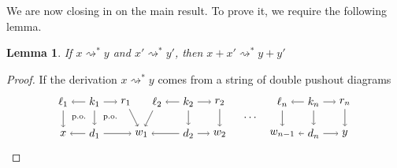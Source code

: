\documentclass{amsart}
\newcommand{\deriv}[2]{#1 \rightsquigarrow^\ast #2}
\newtheorem{lemma}[theorem]{Lemma}
\theoremstyle{remark}
\theoremstyle{definition}
\begin{document}
We are now closing in on the main result.  To prove it, we require the
following lemma.

\begin{lemma}
\label{thm:rewrite-rel-is-additive}
  If $ \deriv{x}{y} $ and $ \deriv{x'}{y'} $, then $ \deriv{x+x'}{y+y'} $
\end{lemma}

\begin{proof}
  If the derivation $ \deriv{x}{y} $ comes from a string of double
  pushout diagrams
  \[
    \begin{tikzpicture}
      \node (1t) at (0,1) {$ \ell_1 $};
      \node (2t) at (1,1) {$ k_1 $};
      \node (3t) at (2,1) {$ r_1 $};
      \node (4t) at (3,1) {$ \ell_2 $};
      \node (5t) at (4,1) {$ k_2 $};
      \node (6t) at (5,1) {$ r_2 $};
      \node (7t) at (7,1) {$ \ell_n $};
      \node (8t) at (8,1) {$ k_n $};
      \node (9t) at (9,1) {$ r_n $};
      \node (1b) at (0,0) {$ x $};
      \node (2b) at (1,0) {$ d_1 $};
      \node (3b) at (2.5,0) {$ w_1 $};
      \node (4b) at (4,0) {$ d_2 $};
      \node (5b) at (5,0) {$ w_2 $};
      \node (6b) at (7,0) {$ w_{n-1} $};
      \node (7b) at (8,0) {$ d_n $};
      \node (8b) at (9,0) {$ y $};
      \draw [->] (2t) to node [] {\scriptsize{$  $}} (1t);
      \draw [->] (2t) to node [] {\scriptsize{$  $}} (3t);
      \draw [->] (5t) to node [] {\scriptsize{$  $}} (4t);
      \draw [->] (5t) to node [] {\scriptsize{$  $}} (6t);
      \draw [->] (8t) to node [] {\scriptsize{$  $}} (7t);
      \draw [->] (8t) to node [] {\scriptsize{$  $}} (9t);
      \draw [->] (2b) to node [] {\scriptsize{$  $}} (1b);
      \draw [->] (2b) to node [] {\scriptsize{$  $}} (3b);
      \draw [->] (4b) to node [] {\scriptsize{$  $}} (3b);
      \draw [->] (4b) to node [] {\scriptsize{$  $}} (5b);
      \draw [->] (7b) to node [] {\scriptsize{$  $}} (6b);
      \draw [->] (7b) to node [] {\scriptsize{$  $}} (8b);
      \draw [->] (1t) to node [] {\scriptsize{$  $}} (1b);
      \draw [->] (2t) to node [] {\scriptsize{$  $}} (2b);
      \draw [->] (3t) to node [] {\scriptsize{$  $}} (3b);
      \draw [->] (4t) to node [] {\scriptsize{$  $}} (3b);
      \draw [->] (5t) to node [] {\scriptsize{$  $}} (4b);
      \draw [->] (6t) to node [] {\scriptsize{$  $}} (5b);
      \draw [->] (7t) to node [] {\scriptsize{$  $}} (6b);
      \draw [->] (8t) to node [] {\scriptsize{$  $}} (7b);
      \draw [->] (9t) to node [] {\scriptsize{$  $}} (8b);
      \node () at (6,0.5) {$ \dotsm $};
      \node () at (0.5,0.5) {\scriptsize{p.o.}};
      \node () at (1.5,0.5) {\scriptsize{p.o.}};

\end{tikzpicture}\]
\end{proof}
\end{document}
